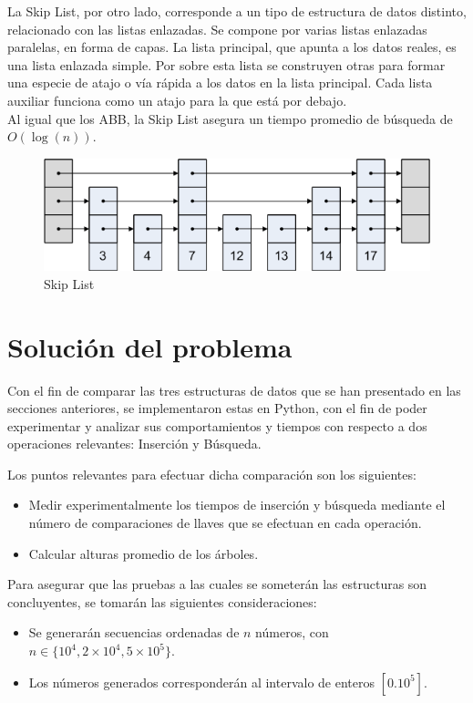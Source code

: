 \documentclass[11pt,letterpaper]{article}
\begin{document}
La Skip List, por otro lado, corresponde a un tipo de estructura de datos distinto, relacionado con las listas enlazadas. Se compone por varias listas enlazadas paralelas, en forma de capas. La lista principal, que apunta a los datos reales, es una lista enlazada simple. Por sobre esta lista se construyen otras para formar una especie de atajo o vía rápida a los datos en la lista principal. Cada lista auxiliar funciona como un atajo para la que está por debajo.\\

Al igual que los ABB, la Skip List asegura un tiempo promedio de búsqueda de $O(\log(n))$.

\begin{figure}[htb]
	\centerline{\includegraphics[scale=0.6]{img/skiplist.png}}
	\caption{Skip List} \label{skiplist}
\end{figure}

\newpage
\section{Solución del problema}

Con el fin de comparar las tres estructuras de datos que se han presentado en las secciones anteriores, se implementaron estas en Python, con el fin de poder experimentar y analizar sus comportamientos y tiempos con respecto a dos operaciones relevantes: Inserción y Búsqueda.

Los puntos relevantes para efectuar dicha comparación son los siguientes:
\begin{itemize}
\item Medir experimentalmente los tiempos de inserción y búsqueda mediante el número de comparaciones de llaves que se efectuan en cada operación.
\item Calcular alturas promedio de los árboles.
\end{itemize}

Para asegurar que las pruebas a las cuales se someterán las estructuras son concluyentes, se tomarán las siguientes consideraciones:
\begin{itemize}
\item Se generarán secuencias ordenadas de $n$ números, con $n \in \{ 10^4, 2\times10^4, 5\times10^5 \}$.
\item Los números generados corresponderán al intervalo de enteros $[ 0. 10^5 ]$.
\end{itemize}
\end{document}
